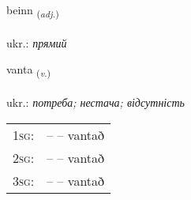 \documentclass[frontgrid, backgrid]{flacards}\usepackage[]{graphicx}\usepackage[]{xcolor}
\begin{document}
\renewcommand{\flhead}{\vskip5pt \fboxsep=0pt {\small\bfseries\footnotesize Lýsingarorð | прикметник}}
\renewcommand{\fcfoot}{\vskip5pt \fboxsep=0pt \hspace{2pt}{\small\bfseries\footnotesize 1K}}

\renewcommand{\blhead}{\vskip5pt {\small\bfseries\footnotesize Lýsingarorð | прикметник }}
\renewcommand{\bcfoot}{\vskip5pt \hspace{2pt}{\small\bfseries\footnotesize 1K}}


{beinn \small{\textsubscript{(\textit{adj.})}} \\[1ex] %
\textphonetic{[peitn̥]} \\
ukr.: \emph{прямий} \\  [2ex]
\renewcommand*{\arraystretch}{0.8}
}

\renewcommand{\flhead}{\vskip5pt \fboxsep=0pt {\small\bfseries\footnotesize Sagnorð | дієслово}}
\renewcommand{\fcfoot}{\vskip5pt \fboxsep=0pt \hspace{2pt}{\small\bfseries\footnotesize 1K}}

\renewcommand{\blhead}{\vskip5pt {\small\bfseries\footnotesize Sagnorð | дієслово }}
\renewcommand{\bcfoot}{\vskip5pt \hspace{2pt}{\small\bfseries\footnotesize 1K}}


{vanta \small{\textsubscript{(\textit{v.})}} \\[1ex] %
\textphonetic{[van̥ta]} \\
ukr.: \emph{потреба; нестача; відсутність} \\  [2ex]
\renewcommand*{\arraystretch}{0.8}
\begin{tabular}{p{1cm}l}
\textsc{1sg}: &  --  -- vantað \\ 
\textsc{2sg}: &  --  -- vantað \\ 
\textsc{3sg}: &  --  -- vantað \\ 
\end{tabular}
}
\end{document}
